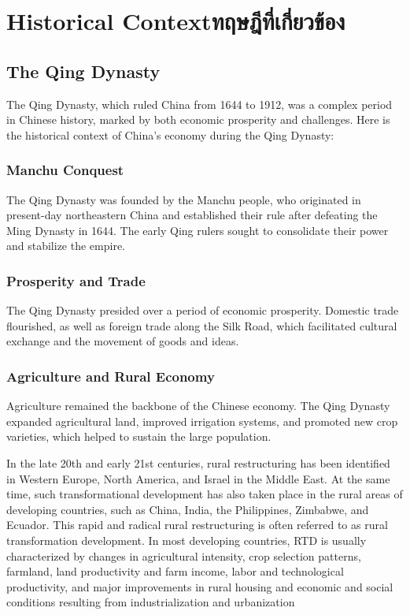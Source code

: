 \chapter{\ifenglish Historical Context\else ทฤษฎีที่เกี่ยวข้อง\fi}

\section{The Qing Dynasty}

The Qing Dynasty, which ruled China from 1644 to 1912, was a complex period in 
Chinese history, marked by both economic prosperity and challenges. Here is the 
historical context of China's economy during the Qing Dynasty:

\subsection{Manchu Conquest}

The Qing Dynasty was founded by the Manchu people, who originated in 
present-day northeastern China and established their rule after 
defeating the Ming Dynasty in 1644. The early Qing rulers sought to 
consolidate their power and stabilize the empire.

\subsection{Prosperity and Trade}

The Qing Dynasty presided over a period of economic prosperity. Domestic 
trade flourished, as well as foreign trade along the Silk Road, which 
facilitated cultural exchange and the movement of goods and ideas.

\subsection{Agriculture and Rural Economy}

Agriculture remained the backbone of the Chinese economy. The Qing Dynasty 
expanded agricultural land, improved irrigation systems, and promoted new 
crop varieties, which helped to sustain the large population.

In the late 20th and early 21st centuries, rural restructuring has been 
identified in Western Europe, North America, and Israel in the Middle East.
At the same time, such transformational development has also taken place 
in the rural areas of developing countries, such as China, India, the 
Philippines, Zimbabwe, and Ecuador. This rapid and radical rural 
restructuring is often referred to as rural transformation development.
In most developing countries, RTD is usually characterized by changes in 
agricultural intensity, crop selection patterns, farmland, land 
productivity and farm income, labor and technological productivity, 
and major improvements in rural housing and economic and social 
conditions resulting from industrialization and urbanization~\cite{LONG20111094}


